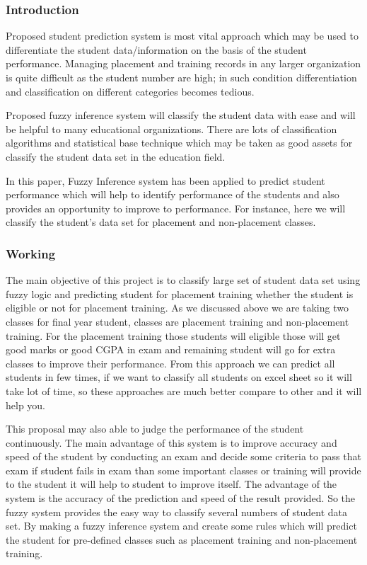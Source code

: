 \documentclass[12pt]{article}
\begin{document}
\subsubsection{Introduction}

Proposed student prediction system is most vital approach which may 
be used to differentiate the student data/information on the basis of the 
student performance. Managing placement and training records in 
any larger organization is quite difficult as the student number are 
high; in such condition differentiation and classification on different 
categories becomes tedious. 

Proposed fuzzy inference system will classify the student data with ease and will be helpful to many 
educational organizations. There are lots of classification algorithms 
and statistical base technique which may be taken as good assets for 
classify the student data set in the education field. 

In this paper, Fuzzy Inference system has been applied to predict student performance 
which will help to identify performance of the students and also 
provides an opportunity to improve to performance. For instance, here 
we will classify the student’s data set for placement and non-placement 
classes.
\newpage
\subsubsection{Working}

The main objective of this project is to classify large set of 
student data set using fuzzy logic and predicting student for 
placement training whether the student is eligible or not for 
placement training. As we discussed above we are taking two 
classes for final year student, classes are placement training and 
non-placement training. For the placement training those students 
will eligible those will get good marks or good CGPA in exam 
and remaining student will go for extra classes to improve their 
performance. From this approach we can predict all students in 
few times, if we want to classify all students on excel sheet so it 
will take lot of time, so these approaches are much better compare 
to other and it will help you. 

This proposal may also able to judge the performance of the 
student continuously. The main advantage of this system is to 
improve accuracy and speed of the student by conducting an exam 
and decide some criteria to pass that exam if student fails in exam 
than some important classes or training will provide to the student 
it will help to student to improve itself. The advantage of the 
system is the accuracy of the prediction and speed of the result 
provided. So the fuzzy system provides the easy way to classify 
several numbers of student data set. By making a fuzzy inference 
system and create some rules which will predict the student for 
pre-defined classes such as placement training and non-placement 
training.
\end{document}
